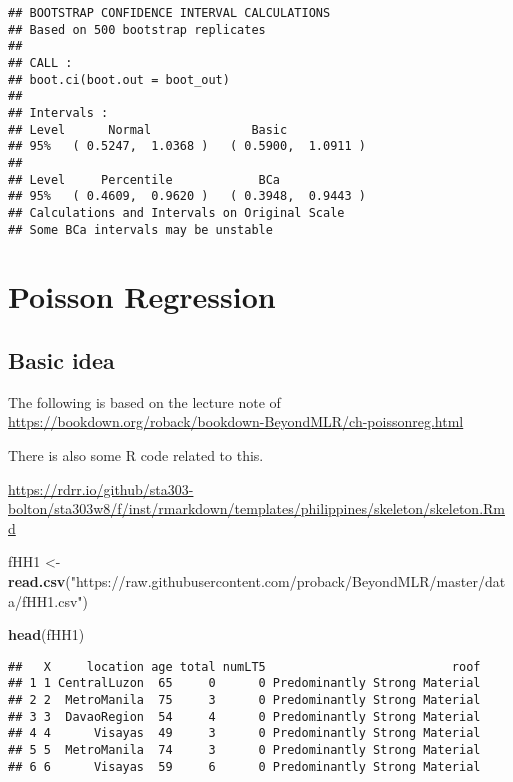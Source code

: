 \documentclass[]{book}
\newenvironment{Shaded}{\begin{snugshade}}{\end{snugshade}}
\newcommand{\KeywordTok}[1]{\textcolor[rgb]{0.13,0.29,0.53}{\textbf{#1}}}
\newcommand{\NormalTok}[1]{#1}
\newcommand{\StringTok}[1]{\textcolor[rgb]{0.31,0.60,0.02}{#1}}
\begin{document}
\begin{verbatim}
## BOOTSTRAP CONFIDENCE INTERVAL CALCULATIONS
## Based on 500 bootstrap replicates
## 
## CALL : 
## boot.ci(boot.out = boot_out)
## 
## Intervals : 
## Level      Normal              Basic         
## 95%   ( 0.5247,  1.0368 )   ( 0.5900,  1.0911 )  
## 
## Level     Percentile            BCa          
## 95%   ( 0.4609,  0.9620 )   ( 0.3948,  0.9443 )  
## Calculations and Intervals on Original Scale
## Some BCa intervals may be unstable
\end{verbatim}

\hypertarget{poisson-regression}{%
\chapter{Poisson Regression}\label{poisson-regression}}

\hypertarget{basic-idea}{%
\section{Basic idea}\label{basic-idea}}

The following is based on the lecture note of \url{https://bookdown.org/roback/bookdown-BeyondMLR/ch-poissonreg.html}

There is also some R code related to this.

\url{https://rdrr.io/github/sta303-bolton/sta303w8/f/inst/rmarkdown/templates/philippines/skeleton/skeleton.Rmd}

\begin{Shaded}
\begin{Highlighting}[]
\NormalTok{fHH1 <-}\StringTok{ }\KeywordTok{read.csv}\NormalTok{(}\StringTok{"https://raw.githubusercontent.com/proback/BeyondMLR/master/data/fHH1.csv"}\NormalTok{)}

\KeywordTok{head}\NormalTok{(fHH1)}
\end{Highlighting}
\end{Shaded}

\begin{verbatim}
##   X     location age total numLT5                          roof
## 1 1 CentralLuzon  65     0      0 Predominantly Strong Material
## 2 2  MetroManila  75     3      0 Predominantly Strong Material
## 3 3  DavaoRegion  54     4      0 Predominantly Strong Material
## 4 4      Visayas  49     3      0 Predominantly Strong Material
## 5 5  MetroManila  74     3      0 Predominantly Strong Material
## 6 6      Visayas  59     6      0 Predominantly Strong Material
\end{verbatim}
\end{document}
